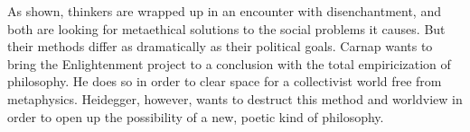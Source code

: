 \documentclass[leqno, 12pt]{turabian-researchpaper}
\begin{document}
	As shown, thinkers are wrapped up in an encounter with disenchantment, and both
	are looking for metaethical solutions to the social problems it causes. But
	their methods differ as dramatically as their political goals. Carnap wants to
	bring the Enlightenment project to a conclusion with the total empiricization of
	philosophy. He does so in order to clear space for a collectivist world free
	from metaphysics. Heidegger, however, wants to destruct this method and worldview
	in order to open up the possibility of a new, poetic kind of philosophy.


\end{document}
